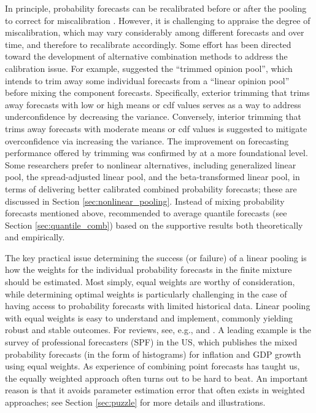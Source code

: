 \documentclass[11pt]{article}
\begin{document}
In principle, probability forecasts can be recalibrated before or after the pooling to correct for miscalibration \citep{Turner2014-za}. However, it is challenging to appraise the degree of miscalibration, which may vary considerably among different forecasts and over time, and therefore to recalibrate accordingly. Some effort has been directed toward the development of alternative combination methods to address the calibration issue. For example, \citet{Jose2014-uh} suggested the ``trimmed opinion pool'', which intends to trim away some individual forecasts from a ``linear opinion pool'' before mixing the component forecasts. Specifically, exterior trimming that trims away forecasts with low or high means or cdf values serves as a way to address underconfidence by decreasing the variance. Conversely, interior trimming that trims away forecasts with moderate means or cdf values is suggested to mitigate overconfidence via increasing the variance. The improvement on forecasting performance offered by trimming was confirmed by \citet{Grushka-Cockayne2017-dj} at a more foundational level. Some researchers prefer to nonlinear alternatives, including generalized linear pool, the spread-adjusted linear pool, and the beta-transformed linear pool, in terms of delivering better calibrated combined probability forecasts; these are discussed in Section \ref{sec:nonlinear_pooling}. Instead of mixing probability forecasts mentioned above, \citet{Lichtendahl2013-rt} recommended to average quantile forecasts (see Section \ref{sec:quantile_comb}) based on the supportive results both theoretically and empirically.

The key practical issue determining the success (or failure) of a linear pooling is how the weights for the individual probability forecasts in the finite mixture should be estimated. Most simply, equal weights are worthy of consideration, while determining optimal weights is particularly challenging in the case of having access to probability forecasts with limited historical data. Linear pooling with equal weights is easy to understand and implement, commonly yielding robust and stable outcomes. For reviews, see, e.g., \citet{Wallis2005-yf} and \citet{OHagan2006-jk}. A leading example is the survey of professional forecasters (SPF) in the US, which publishes the mixed probability forecasts (in the form of histograms) for inflation and GDP growth using equal weights. As experience of combining point forecasts has taught us, the equally weighted approach often turns out to be hard to beat. An important reason is that it avoids parameter estimation error that often exists in weighted approaches; see Section \ref{sec:puzzle} for more details and illustrations.
\end{document}
